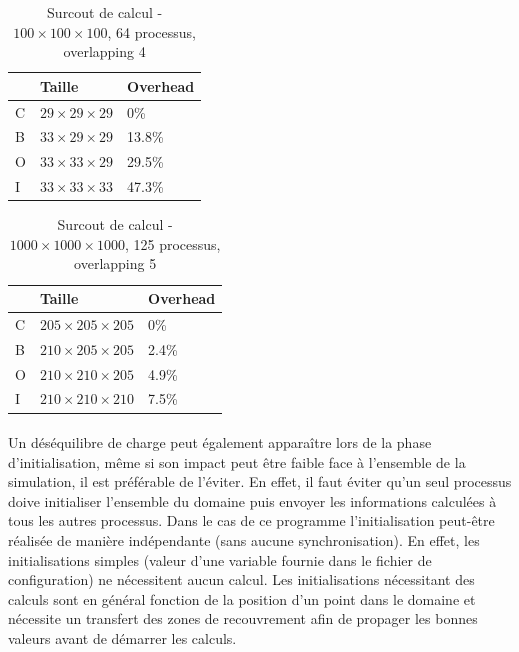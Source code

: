 \begin{table}[!ht]
  \begin{center}
    \begin{tabular}{|P{2cm}|P{3.5cm}|P{3.5cm}|}
      \hline
      & Taille & Overhead \\ \hline
      C & $29\times29\times29$ & 0\%  \\ \hline
      B & $33\times29\times29$ & 13.8\%  \\ \hline
      O & $33\times33\times29$ & 29.5\%  \\ \hline
      I & $33\times33\times33$ & 47.3\%  \\ \hline      
    \end{tabular}
    \caption{\label{arr:overlap_res}Surcout de calcul - $100\times100\times100$, 64 processus, overlapping 4}
  \end{center}
\end{table}


\begin{table}[!ht]
  \begin{center}
    \begin{tabular}{|P{2cm}|P{3.5cm}|P{3.5cm}|}
      \hline
      & Taille & Overhead \\ \hline
      C & $205\times205\times205$ & 0\%    \\ \hline
      B & $210\times205\times205$ & 2.4\%  \\ \hline
      O & $210\times210\times205$ & 4.9\%  \\ \hline
      I & $210\times210\times210$ & 7.5\%  \\ \hline      
    \end{tabular}
    \caption{\label{arr:overlap_res_big}Surcout de calcul - $1000\times1000\times1000$, 125 processus, overlapping 5}
  \end{center}
\end{table}


\paragraph{}Un déséquilibre de charge peut également apparaître lors de la phase d'initialisation, même si son impact peut être faible face à l'ensemble de la simulation, il est préférable de l'éviter. En effet, il faut éviter qu'un seul processus doive initialiser l'ensemble du domaine puis envoyer les informations calculées à tous les autres processus. Dans le cas de ce programme l'initialisation peut-être réalisée de manière indépendante (sans aucune synchronisation). En effet, les initialisations simples (valeur d'une variable fournie dans le fichier de configuration) ne nécessitent aucun calcul. Les initialisations nécessitant des calculs sont en général fonction de la position d'un point dans le domaine et nécessite un transfert des zones de recouvrement afin de propager les bonnes valeurs avant de démarrer les calculs.


